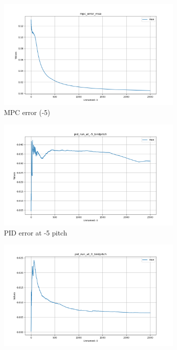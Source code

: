 \begin{figure}[h!]
    \centering
    \begin{subfigure}[b]{0.49\textwidth}
        \centering
        \includegraphics[width=\textwidth]{./Resources/mpc_error_mse.png}
        \caption{MPC error (-5\textdegree{})}
    \end{subfigure}
    \begin{subfigure}[b]{0.49\textwidth}
        \centering
        \includegraphics[width=\textwidth]{./Resources/pid_run_at_-5_birdpitch.png}
    \caption{PID error at -5\textdegree{} pitch}
    \end{subfigure}
    \begin{subfigure}[b]{0.49\textwidth}
        \centering
        \includegraphics[width=\textwidth]{./Resources/pid_run_at_0_birdpitch.png}

\end{subfigure}
\end{figure}
